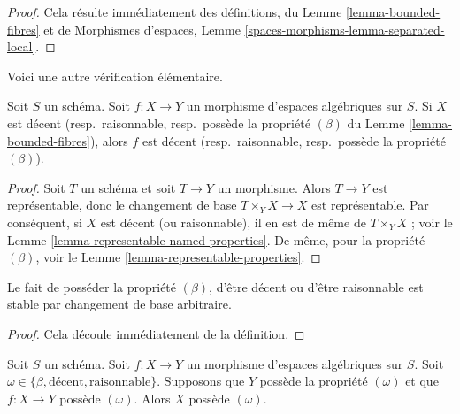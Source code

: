 \begin{proof}
Cela résulte immédiatement des définitions, du
Lemme \ref{lemma-bounded-fibres}
et de
Morphismes d'espaces,
Lemme \ref{spaces-morphisms-lemma-separated-local}.
\end{proof}

\noindent
Voici une autre vérification élémentaire.

\begin{lemma}
\label{lemma-property-for-morphism-out-of-property}
Soit $S$ un schéma. Soit $f : X \to Y$ un morphisme d'espaces
algébriques sur $S$. Si $X$ est décent (resp.\ raisonnable, resp.\ possède la
propriété $(\beta)$ du Lemme \ref{lemma-bounded-fibres}), alors $f$ est décent
(resp.\ raisonnable, resp.\ possède la propriété $(\beta)$).
\end{lemma}

\begin{proof}
Soit $T$ un schéma et soit $T \to Y$ un morphisme. Alors $T \to Y$ est
représentable, donc le changement de base $T \times_Y X \to X$ est
représentable. Par conséquent, si $X$ est décent (ou raisonnable), il en est
de
même de $T \times_Y X$ ; voir le
Lemme \ref{lemma-representable-named-properties}.
De même, pour la propriété $(\beta)$, voir le
Lemme \ref{lemma-representable-properties}.
\end{proof}

\begin{lemma}
\label{lemma-base-change-relative-conditions}
Le fait de posséder la propriété $(\beta)$, d'être décent ou d'être
raisonnable est stable par changement de base arbitraire.
\end{lemma}

\begin{proof}
Cela découle immédiatement de la définition.
\end{proof}

\begin{lemma}
\label{lemma-property-over-property}
Soit $S$ un schéma.
Soit $f : X \to Y$ un morphisme d'espaces algébriques sur $S$.
Soit $\omega \in \{\beta, \text{décent}, \text{raisonnable}\}$.
Supposons que $Y$ possède la propriété $(\omega)$ et que $f : X \to Y$
possède $(\omega)$. Alors $X$ possède $(\omega)$.
\end{lemma}

